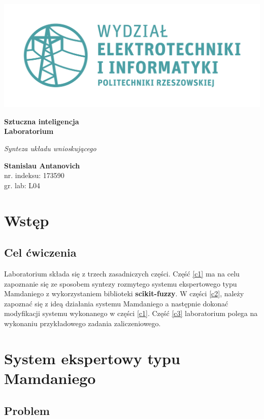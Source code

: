\documentclass[a4paper, 10pt]{article}
\begin{document}
\begin{titlepage}
\begin{center}
	\includegraphics[scale=0.7]{logo.png}

	\vspace*{4cm}
	\textbf{Sztuczna inteligencja\\ Laboratorium}

	\vspace{1.5cm}
	\textit{Synteza układu wnioskującego}

	\vspace{1.5cm}
	\textbf{Stanislau Antanovich}\\
	nr. indeksu: 173590\\
	gr. lab: L04
\end{center}
\end{titlepage}

\tableofcontents
\listoffigures

\newpage
\section{Wstęp}
\subsection{Cel ćwiczenia}

Laboratorium składa się z trzech zasadniczych części. Część \ref{c1} ma na celu zapoznanie się ze sposobem syntezy rozmytego systemu ekspertowego typu Mamdaniego z wykorzystaniem biblioteki \textbf{scikit-fuzzy}. W części \ref{c2}, należy zapoznać się z ideą działania systemu Mamdaniego a następnie dokonać modyfikacji systemu wykonanego w części \ref{c1}. Część \ref{c3} laboratorium polega na wykonaniu przykładowego zadania zaliczeniowego.

\section{System ekspertowy typu Mamdaniego}\label{sec:c1}
\subsection{Problem}
\end{document}
